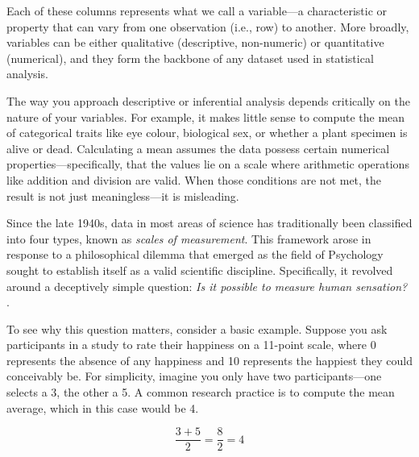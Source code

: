 Each of these columns represents what we call a variable—a characteristic or property that can vary from one observation (i.e., row) to another. More broadly, variables can be either qualitative (descriptive, non-numeric) or quantitative (numerical), and they form the backbone of any dataset used in statistical analysis.

The way you approach descriptive or inferential analysis depends critically on the nature of your variables. For example, it makes little sense to compute the mean of categorical traits like eye colour, biological sex, or whether a plant specimen is alive or dead. Calculating a mean assumes the data possess certain numerical properties—specifically, that the values lie on a scale where arithmetic operations like addition and division are valid. When those conditions are not met, the result is not just meaningless—it is misleading.

Since the late 1940s, data in most areas of science has traditionally been classified into four types, known as \textit{scales of measurement}. This framework arose in response to a philosophical dilemma that emerged as the field of Psychology sought to establish itself as a valid scientific discipline. Specifically, it revolved around a deceptively simple question: \textit{Is it possible to measure human sensation?} \parencite[p. 677]{Stevens1946}.

To see why this question matters, consider a basic example. Suppose you ask participants in a study to rate their happiness on a 11-point scale, where 0 represents the absence of any happiness and 10 represents the happiest they could
conceivably be. For simplicity, imagine you only have two participants—one selects a 3, the other a 5. A common research practice is to compute the mean average, which in this case would be 4. 

\begin{equation}
\frac{3 + 5}{2} = \frac{8}{2} = 4
\end{equation}


